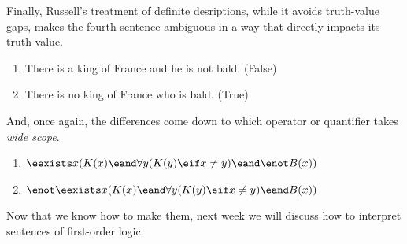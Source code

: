 Finally, Russell's treatment of definite desriptions, while it avoids
truth-value gaps, makes the fourth sentence ambiguous in a way that
directly impacts its truth value.

\begin{enumerate}
\item There is a king of France and he is not bald. (False)
\item There is no king of France who is bald. (True)
\end{enumerate}

And, once again, the differences come down to which operator or quantifier
takes \emph{wide scope}. 

\begin{enumerate}
\item $\eexists x(K(x)\eand\forall y(K(y)\eif x\neq y)\eand\enot B(x))$
\item $\enot\eexists x(K(x)\eand\forall y(K(y)\eif x\neq y)\eand B(x))$
\end{enumerate}

Now that we know how to make them, next week we will discuss how to interpret
sentences of first-order logic.
